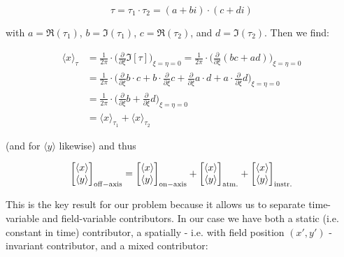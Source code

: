 \documentclass[a4paper]{article}
\begin{document}
\begin{equation}
\tau  = \tau_1 \cdot \tau_2 = (a + bi)\cdot (c + di)
\end{equation}

with $a = \Re(\tau_1)$, $b = \Im(\tau_1)$, $c = \Re(\tau_2)$, and $d = \Im(\tau_2)$. Then we find:

\begin{align}
\langle x \rangle_{\tau} & = \frac{1}{2\pi} \cdot \Big(\frac{\partial}{\partial\xi}\Im[\tau]\Big)_{\xi = \eta = 0} = \frac{1}{2\pi} \cdot \Big(\frac{\partial}{\partial\xi}(bc+ad)\Big)_{\xi = \eta = 0}\nonumber \\ 
& = \frac{1}{2\pi} \cdot \Big(\frac{\partial}{\partial\xi}b \cdot c + b \cdot \frac{\partial}{\partial\xi}c + \frac{\partial}{\partial\xi}a \cdot d + a \cdot \frac{\partial}{\partial\xi}d\Big)_{\xi = \eta = 0}\nonumber \\
& = \frac{1}{2\pi} \cdot \Big(\frac{\partial}{\partial\xi}b + \frac{\partial}{\partial\xi}d\Big)_{\xi = \eta = 0}\nonumber \\
& = \langle x \rangle_{\tau_1} + \langle x \rangle_{\tau_2}
\end{align}

(and for $\langle y \rangle$ likewise) and thus
 
\begin{equation}
\begin{bmatrix}
        \langle x \rangle \\ \langle y \rangle \end{bmatrix}_{\rm{off-axis}} = \begin{bmatrix} \langle x \rangle \\ \langle y \rangle\end{bmatrix}_{\rm{on-axis}} + \begin{bmatrix}\langle x \rangle \\ \langle y \rangle\end{bmatrix}_{\rm{atm.}} + \begin{bmatrix}\langle x \rangle \\ \langle y \rangle\end{bmatrix}_{\rm{instr.}}
\end{equation}

This is the key result for our problem because it allows us to separate time-variable and field-variable contributors. In our case we have both a static (i.e. constant in time) contributor, a spatially - i.e. with field position $(x',y')$ - invariant contributor, and a mixed contributor: 
\end{document}
